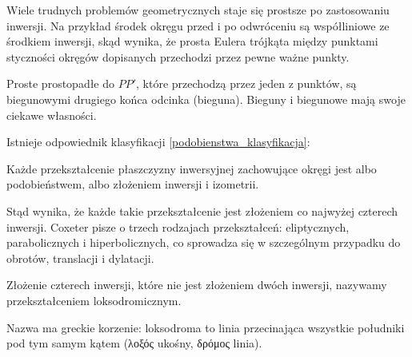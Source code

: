 Wiele trudnych problemów geometrycznych staje się prostsze po zastosowaniu inwersji.
Na przykład środek okręgu przed i po odwróceniu są współliniowe ze środkiem inwersji, skąd wynika, że prosta Eulera trójkąta między punktami styczności okręgów dopisanych przechodzi przez pewne ważne punkty.

Proste prostopadłe do $PP'$, które przechodzą przez jeden z punktów, są biegunowymi drugiego końca odcinka (bieguna).
Bieguny i biegunowe mają swoje ciekawe własności.


Istnieje odpowiednik klasyfikacji \ref{podobienstwa_klasyfikacja}:

\begin{proposition}
    Każde przekształcenie płaszczyzny inwersyjnej zachowujące okręgi jest albo podobieństwem, albo złożeniem inwersji i izometrii.
\end{proposition}

Stąd wynika, że każde takie przekształcenie jest złożeniem co najwyżej czterech inwersji.
Coxeter \cite[s. 108]{coxeter_1967} pisze o trzech rodzajach przekształceń: eliptycznych, parabolicznych i hiperbolicznych, co sprowadza się w szczególnym przypadku do obrotów, translacji i dylatacji.

\begin{proposition}
    Złożenie czterech inwersji, które nie jest złożeniem dwóch inwersji, nazywamy przekształceniem loksodromicznym.
\end{proposition}

Nazwa ma greckie korzenie: loksodroma to linia przecinająca wszystkie południki pod tym samym kątem (λοξός ukośny, δρόμος linia).

%
